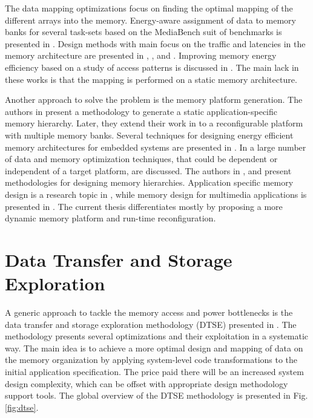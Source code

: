 The data mapping optimizations focus on finding the optimal mapping of the different arrays into the memory.
Energy-aware assignment of data to memory banks for several task-sets based on the MediaBench suit of benchmarks is presented in \cite{Mar03}. 
Design methods with main focus on the traffic and latencies in the memory architecture are presented in \cite{chen1999loop}, \cite{grun2000mist}, \cite{jantsch1994hardware} and \cite{passes1995multi}.
Improving memory energy efficiency based on a study of access patterns is discussed in \cite{kandemir2001improving}.
The main lack in these works is that the mapping is performed on a static memory architecture.

Another approach to solve the problem is the memory platform generation.
The authors in \cite{Ben00b} present a methodology to generate a static application-specific memory hierarchy. 
Later, they extend their work in \cite{Ben00c} to a reconfigurable platform with multiple memory banks. 
Several techniques for designing energy efficient memory architectures for embedded systems are presented in \cite{Mac02}. 
In \cite{Pgk01} a large number of data and memory optimization techniques, that could be dependent or independent of a target platform, are discussed. 
The authors in \cite{abraham1999automatic}, \cite{jacob1996analytical} and \cite{li1999hardware} present methodologies for designing memory hierarchies.
Application specific memory design is a research topic in \cite{schmit1997synthesis}, while memory design for multimedia applications is presented in \cite{oshima1997high}.
The current thesis differentiates mostly by proposing a more dynamic memory platform and run-time reconfiguration. 

\section{Data Transfer and Storage Exploration}

A generic approach to tackle the memory access and power bottlenecks is the data transfer and storage exploration methodology (DTSE)  presented in \cite{dtse}.
The methodology presents several optimizations and their exploitation in a systematic way. 
The main idea is to achieve a more optimal design and mapping of data on the memory organization by applying system-level code transformations to the initial application specification. 
The price paid there will be an increased system design complexity, which can be offset with appropriate design methodology support tools. 
The global overview of the DTSE methodology is presented in Fig. \ref{fig:dtse}.

